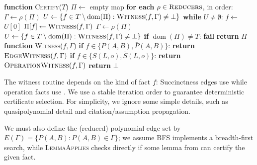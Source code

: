 \begin{algorithm}[t]
\caption{Certificate selection}
\label{alg:certification}
\begin{algorithmic}[1]
\raggedright
\STATE \textbf{function} \textsc{Certify}(\(T\))
\STATE \(\Pi\leftarrow\) empty map
\STATE \textbf{for each} \(\rho\in\textsc{Reducers}\), in order:
\STATE \hspace{\algorithmicindent}\(\Gamma\leftarrow\rho(\Pi)\)
\STATE \hspace{\algorithmicindent}\(U\leftarrow\{f\in T\setminus\operatorname{dom}(\Pi): \textsc{Witness}(f,\Gamma)\neq\bot\}\)
\STATE \hspace{\algorithmicindent}\textbf{while} \(U\neq\emptyset\):
\STATE \hspace{2\algorithmicindent}\(f\leftarrow\) \(U[0]\)
\STATE \hspace{2\algorithmicindent}\(\Pi[f]\leftarrow\textsc{Witness}(f,\Gamma)\)
\STATE \hspace{2\algorithmicindent}\(\Gamma\leftarrow\rho(\Pi)\)
\STATE \hspace{2\algorithmicindent}\(U\leftarrow\{f\in T\setminus\operatorname{dom}(\Pi): \textsc{Witness}(f,\Gamma)\neq\bot\}\)
\STATE \textbf{if} \(\operatorname{dom}(\Pi)\neq T\): \textbf{fail}
\STATE \textbf{return} \(\Pi\)
\vspace{0.4ex}
\STATE \textbf{function} \textsc{Witness}(\(f,\Gamma\))
\STATE \textbf{if} \(f\in\{P(A,B),\bar P(A,B)\}\):
\STATE \hspace{\algorithmicindent}
       \textbf{return} \(\textsc{EdgeWitness}(f,\Gamma)\)
\STATE \textbf{if} \(f\in\{S(L,o),\bar S(L,o)\}\):
\STATE \hspace{\algorithmicindent}
       \textbf{return} \(\textsc{OperationWitness}(f,\Gamma)\)
\STATE \textbf{return} \(\bot\)
\end{algorithmic}
\end{algorithm}



The witness routine depends on the kind of fact $f$: Succinctness edges use  while operation facts use . We use a stable iteration order to guarantee deterministic certificate selection. For simplicity, we ignore some simple details, such as quasipolynomial detail and citation/assumption propagation.

We must also define the (reduced) polynomial edge set by $E(\Gamma)=\{P(A,B):P(A,B)\in\Gamma\}$; we assume \textsc{BFS} implements a breadth-first search, while \textsc{LemmaApplies} checks directly if some lemma from  can certify the given fact.


